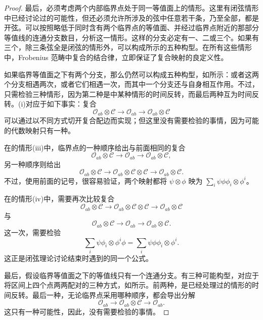\begin{proof}
最后，必须考虑两个内部临界点处于同一等值面上的情形。这里有闭弦情形中已经讨论过的可能性，但还必须允许所涉及的弦中任意若干条，乃至全部，都是开弦。可以按照略低于同时含有两个临界点的等值面、并经过临界点附近的那部分等值线的连通分支数目，分析这一情形。这样的分支必定有一、二或三个。如果有三个，除三条弦全是闭弦的情形外，可以构成所示的五种构型。在所有这些情形中，Frobenius 范畴中复合的结合律，立即保证了复合映射的良定义性。

\begin{figure}[H]
\centering
{}
\BookNumberOnlyCaption\label{fig:2.42}
\end{figure}

如果临界等值面之下有两个分支，那么仍然可以构成五种构型，如所示：或者这两个分支相遇两次，或者它们相遇一次，而其中一个分支还与自身相互作用。不过，只需检验三种情形，因为第二种是中某种情形的时间反转，而最后两种互为时间反转。(i)对应于如下事实：复合
\[
\mathcal{O}_{ab}\otimes\mathcal{C}\longrightarrow\mathcal{O}_{ab}
\longrightarrow\mathcal{O}_{ab}\otimes\mathcal{C}
\]
可以通过以不同方式切开复合配边而实现；但这里没有需要检验的事情，因为可能的代数映射只有一种。

在的情形(iii)中，临界点的一种顺序给出与前面相同的复合
\[
\mathcal{O}_{ab}\otimes\mathcal{C}\longrightarrow\mathcal{O}_{ab}
\longrightarrow\mathcal{O}_{ab}\otimes\mathcal{C},
\]
另一种顺序则给出
\[
\mathcal{O}_{ab}\otimes\mathcal{C}\longrightarrow
\mathcal{O}_{ab}\otimes\mathcal{C}\otimes\mathcal{C}
\longrightarrow\mathcal{O}_{ab}\otimes\mathcal{C}.
\]
不过，使用前面的记号，很容易验证，两个映射都将 $\psi\otimes\phi$ 映为 $\sum_i\psi\phi\phi_i\otimes\phi^i$。

在的情形(iv)中，需要再次比较复合
\[
\mathcal{O}_{ab}\otimes\mathcal{C}\longrightarrow
\mathcal{O}_{ab}\otimes\mathcal{C}\otimes\mathcal{C}
\longrightarrow\mathcal{O}_{ab}\otimes\mathcal{C}
\]
与
\[
\mathcal{O}_{ab}\otimes\mathcal{C}\longrightarrow\mathcal{O}_{ab}
\longrightarrow\mathcal{O}_{ab}\otimes\mathcal{C}.
\]
这一次，需要检验
\[
\sum_i\psi\phi_i\otimes\phi^i\phi=\sum_i\psi\phi\phi_i\otimes\phi^i.
\]
这正是闭弦理论讨论结束时遇到的同一个公式。

最后，假设临界等值面之下的等值线只有一个连通分支。有三种可能构型，对应于将区间上四个点两两配对的三种方式，如所示。前两种，是已经处理过的情形的时间反转。最后一种，无论临界点采用哪种顺序，都会导出分解
\[
\mathcal{O}_{ab}\longrightarrow\mathcal{O}_{ab}\otimes\mathcal{C}
\longrightarrow\mathcal{O}_{ab}.
\]
这只有一种可能性，因此，没有需要检验的事情。


\end{proof}
